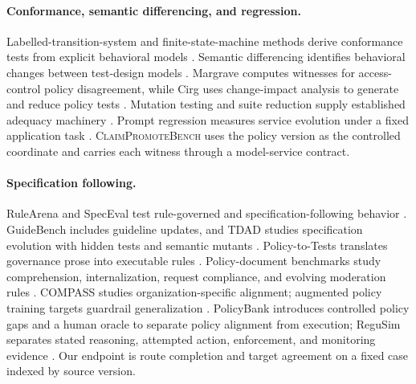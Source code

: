 \documentclass[10pt]{article}
\newcommand{\cpb}{\textsc{ClaimPromoteBench}\xspace}
\begin{document}
\paragraph{Conformance, semantic differencing, and regression.}
Labelled-transition-system and finite-state-machine methods derive conformance tests from explicit
behavioral models \cite{tretmans1996conformance,chow1978fsm}. Semantic differencing identifies
behavioral changes between test-design models \cite{tzorefbrill2017semantic}. Margrave computes
witnesses for access-control policy disagreement, while Cirg uses change-impact analysis to generate
and reduce policy tests \cite{fisler2005policychange,martin2007policytests}. Mutation testing and
suite reduction supply established adequacy machinery
\cite{martin2007policymutation,harrold1993testsuite}. Prompt regression measures service evolution
under a fixed application task \cite{ma2024promptregression}. \cpb uses the policy version as the
controlled coordinate and carries each witness through a model-service contract.

\paragraph{Specification following.}
RuleArena and SpecEval test rule-governed and specification-following behavior
\cite{zhou2025rulearena,ahmed2025speceval}. GuideBench includes guideline updates, and TDAD studies
specification evolution with hidden tests and semantic mutants
\cite{diao2025guidebench,rehan2026tdad}. Policy-to-Tests translates governance prose into executable
rules \cite{datla2025policytotests}. Policy-document benchmarks study comprehension,
internalization, request compliance, and evolving moderation rules
\cite{bao2026policyllm,liu2026policyinternalization,cisneros2026policycompliance,
mullick2023evolving,ji2026argus}. COMPASS studies organization-specific alignment; augmented policy
training targets guardrail generalization
\cite{choi2026compass,liu2026augmentedpolicy}. PolicyBank introduces controlled policy gaps and a
human oracle to separate policy alignment from execution; ReguSim separates stated reasoning,
attempted action, enforcement, and monitoring evidence
\cite{choi2026policybank,luo2026regusim}. Our endpoint is route completion and target agreement on a
fixed case indexed by source version.
\end{document}
